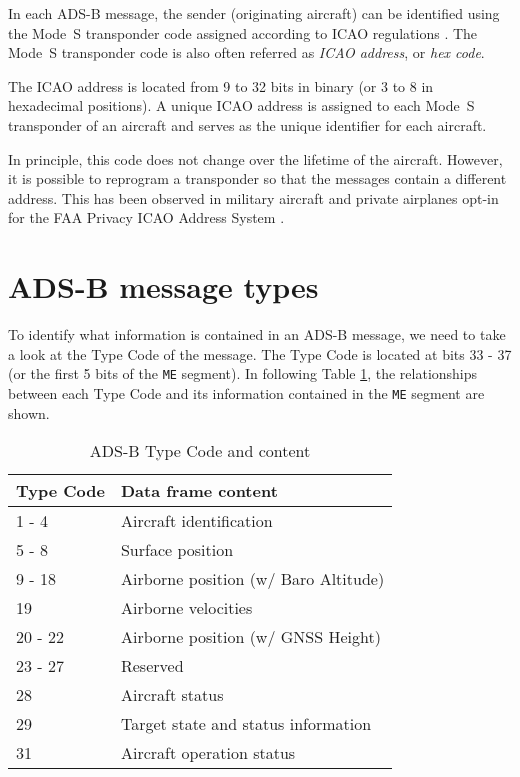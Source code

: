 In each ADS-B message, the sender (originating aircraft) can be identified using the Mode~S transponder code assigned according to ICAO regulations \cite{blythe2011}. The Mode~S transponder code is also often referred as \emph{ICAO address}, or \emph{hex code}. 

The ICAO address is located from 9 to 32 bits in binary (or 3 to 8 in hexadecimal positions). A unique ICAO address is assigned to each Mode~S transponder of an aircraft and serves as the unique identifier for each aircraft. 

In principle, this code does not change over the lifetime of the aircraft. However, it is possible to reprogram a transponder so that the messages contain a different address. This has been observed in military aircraft and private airplanes opt-in for the FAA Privacy ICAO Address System \cite{gray2019}.


\section{ADS-B message types}

To identify what information is contained in an ADS-B message, we need to take a look at the Type Code of the message. The Type Code is located at bits 33 - 37 (or the first 5 bits of the \texttt{ME} segment). In following Table \ref{tb:adsb-tc}, the relationships between each Type Code and its information contained in the \texttt{ME} segment are shown.

\begin{table}[ht]
\centering
\caption{ADS-B Type Code and content}
\label{tb:adsb-tc}
\begin{tabular}{|l|l|}
\hline
\textbf{Type Code} & \textbf{Data frame content} \\  \hline \hline
1 - 4     & Aircraft identification              \\  \hline
5 - 8     & Surface position                     \\  \hline
9 - 18    & Airborne position (w/ Baro Altitude) \\  \hline
19        & Airborne velocities                  \\  \hline
20 - 22   & Airborne position (w/ GNSS Height)   \\  \hline
23 - 27   & Reserved                             \\  \hline
28        & Aircraft status                      \\  \hline
29        & Target state and status information  \\  \hline
31        & Aircraft operation status            \\  \hline
\end{tabular}
\end{table}


